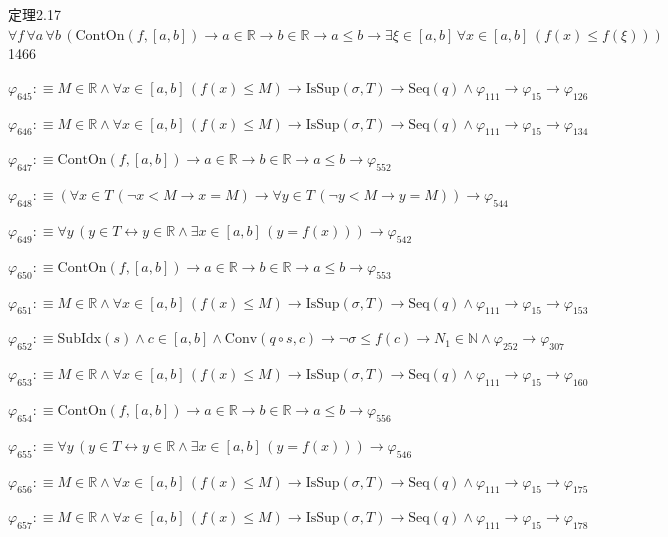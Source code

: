 \begin{fullproof}{定理2.17}{$\forall f\,\forall a\,\forall b\,(\mathrm{ContOn}(f,[a,b]) \to a \in \mathbb{R} \to b \in \mathbb{R} \to a \leq b \to \exists \xi \in [a,b]\,\forall x \in [a,b]\,(f(x) \leq f(\xi)))$}{1466}
\begin{abbrevlist}
\item $\varphi_{645} :\equiv M \in \mathbb{R} \land \forall x \in [a,b]\,(f(x) \leq M) \to \mathrm{IsSup}(\sigma,T) \to \mathrm{Seq}(q) \land \varphi_{111} \to \varphi_{15} \to \varphi_{126}$
\item $\varphi_{646} :\equiv M \in \mathbb{R} \land \forall x \in [a,b]\,(f(x) \leq M) \to \mathrm{IsSup}(\sigma,T) \to \mathrm{Seq}(q) \land \varphi_{111} \to \varphi_{15} \to \varphi_{134}$
\item $\varphi_{647} :\equiv \mathrm{ContOn}(f,[a,b]) \to a \in \mathbb{R} \to b \in \mathbb{R} \to a \leq b \to \varphi_{552}$
\item $\varphi_{648} :\equiv (\forall x \in T\,(\neg x < M \to x = M) \to \forall y \in T\,(\neg y < M \to y = M)) \to \varphi_{544}$
\item $\varphi_{649} :\equiv \forall y\,(y \in T \leftrightarrow y \in \mathbb{R} \land \exists x \in [a,b]\,(y = f(x))) \to \varphi_{542}$
\item $\varphi_{650} :\equiv \mathrm{ContOn}(f,[a,b]) \to a \in \mathbb{R} \to b \in \mathbb{R} \to a \leq b \to \varphi_{553}$
\item $\varphi_{651} :\equiv M \in \mathbb{R} \land \forall x \in [a,b]\,(f(x) \leq M) \to \mathrm{IsSup}(\sigma,T) \to \mathrm{Seq}(q) \land \varphi_{111} \to \varphi_{15} \to \varphi_{153}$
\item $\varphi_{652} :\equiv \mathrm{SubIdx}(s) \land c \in [a,b] \land \mathrm{Conv}(q \circ s,c) \to \neg \sigma \leq f(c) \to N_{1} \in \mathbb{N} \land \varphi_{252} \to \varphi_{307}$
\item $\varphi_{653} :\equiv M \in \mathbb{R} \land \forall x \in [a,b]\,(f(x) \leq M) \to \mathrm{IsSup}(\sigma,T) \to \mathrm{Seq}(q) \land \varphi_{111} \to \varphi_{15} \to \varphi_{160}$
\item $\varphi_{654} :\equiv \mathrm{ContOn}(f,[a,b]) \to a \in \mathbb{R} \to b \in \mathbb{R} \to a \leq b \to \varphi_{556}$
\item $\varphi_{655} :\equiv \forall y\,(y \in T \leftrightarrow y \in \mathbb{R} \land \exists x \in [a,b]\,(y = f(x))) \to \varphi_{546}$
\item $\varphi_{656} :\equiv M \in \mathbb{R} \land \forall x \in [a,b]\,(f(x) \leq M) \to \mathrm{IsSup}(\sigma,T) \to \mathrm{Seq}(q) \land \varphi_{111} \to \varphi_{15} \to \varphi_{175}$
\item $\varphi_{657} :\equiv M \in \mathbb{R} \land \forall x \in [a,b]\,(f(x) \leq M) \to \mathrm{IsSup}(\sigma,T) \to \mathrm{Seq}(q) \land \varphi_{111} \to \varphi_{15} \to \varphi_{178}$

\end{abbrevlist}
\end{fullproof}
